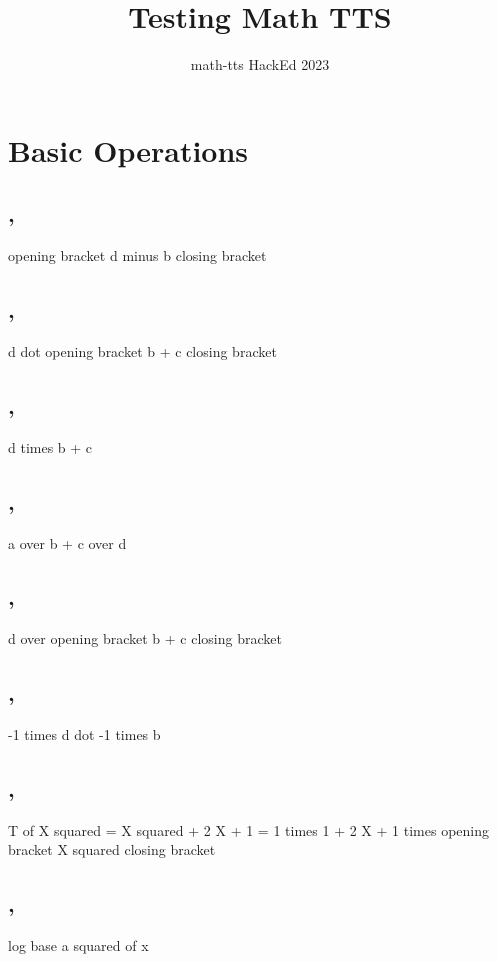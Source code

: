 \title{Testing Math TTS}
\author{math-tts HackEd 2023}



\maketitle

\section*{Basic Operations}

\subsection*{,}
opening bracket d minus b closing bracket

\subsection*{,}
d dot opening bracket b + c closing bracket

\subsection*{,}
d times b + c

\subsection*{,}
a over b + c over d

\subsection*{,}
d over opening bracket b + c closing bracket

\subsection*{,}
-1 times d dot -1 times b

\subsection*{,}
T of X squared = X squared + 2 X + 1 = 1 times 1 + 2 X + 1 times opening bracket X squared closing bracket

\subsection*{,}
log base a squared of x

